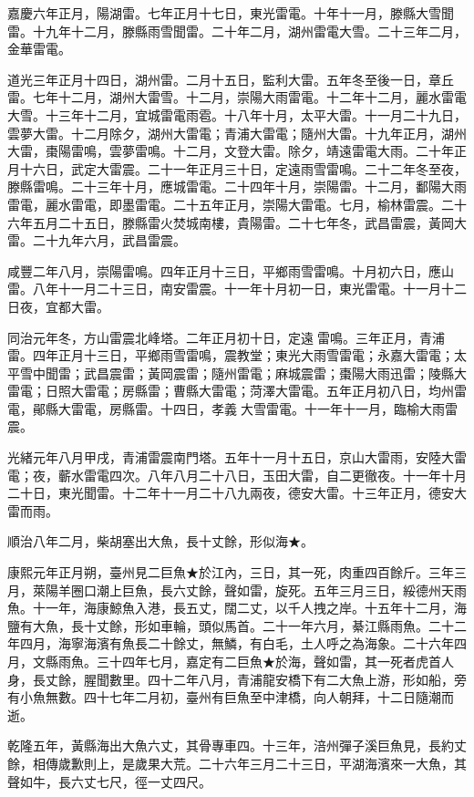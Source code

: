 \begin{pinyinscope}
嘉慶六年正月，陽湖雷。七年正月十七日，東光雷電。十年十一月，滕縣大雪聞雷。十九年十二月，滕縣雨雪聞雷。二十年二月，湖州雷電大雪。二十三年二月，金華雷電。

道光三年正月十四日，湖州雷。二月十五日，監利大雷。五年冬至後一日，章丘雷。七年十二月，湖州大雷雪。十二月，崇陽大雨雷電。十二年十二月，麗水雷電大雪。十三年十二月，宜城雷電雨雹。十八年十月，太平大雷。十一月二十九日，雲夢大雷。十二月除夕，湖州大雷電；青浦大雷電；隨州大雷。十九年正月，湖州大雷，棗陽雷鳴，雲夢雷鳴。十二月，文登大雷。除夕，靖遠雷電大雨。二十年正月十六日，武定大雷震。二十一年正月三十日，定遠雨雪雷鳴。二十二年冬至夜，滕縣雷鳴。二十三年十月，應城雷電。二十四年十月，崇陽雷。十二月，鄱陽大雨雷電，麗水雷電，即墨雷電。二十五年正月，崇陽大雷電。七月，榆林雷震。二十六年五月二十五日，滕縣雷火焚城南樓，貴陽雷。二十七年冬，武昌雷震，黃岡大雷。二十九年六月，武昌雷震。

咸豐二年八月，崇陽雷鳴。四年正月十三日，平鄉雨雪雷鳴。十月初六日，應山雷。八年十一月二十三日，南安雷震。十一年十月初一日，東光雷電。十一月十二日夜，宜都大雷。

同治元年冬，方山雷震北峰塔。二年正月初十日，定遠雷鳴。三年正月，青浦雷。四年正月十三日，平鄉雨雪雷鳴，震教堂；東光大雨雪雷電；永嘉大雷電；太平雪中聞雷；武昌震雷；黃岡震雷；隨州雷電；麻城震雷；棗陽大雨迅雷；陵縣大雷電；日照大雷電；房縣雷；曹縣大雷電；菏澤大雷電。五年正月初八日，均州雷電，鄖縣大雷電，房縣雷。十四日，孝義大雪雷電。十一年十一月，臨榆大雨雷震。

光緒元年八月甲戌，青浦雷震南門塔。五年十一月十五日，京山大雷雨，安陸大雷電；夜，蘄水雷電四次。八年八月二十八日，玉田大雷，自二更徹夜。十一年十月二十日，東光聞雷。十二年十一月二十八九兩夜，德安大雷。十三年正月，德安大雷而雨。

順治八年二月，柴胡塞出大魚，長十丈餘，形似海★。

康熙元年正月朔，臺州見二巨魚★於江內，三日，其一死，肉重四百餘斤。三年三月，萊陽羊圈口潮上巨魚，長六丈餘，聲如雷，旋死。五年三月三日，綏德州天雨魚。十一年，海康鯨魚入港，長五丈，闊二丈，以千人拽之岸。十五年十二月，海鹽有大魚，長十丈餘，形如車輪，頭似馬首。二十一年六月，綦江縣雨魚。二十二年四月，海寧海濱有魚長二十餘丈，無鱗，有白毛，土人呼之為海象。二十六年四月，文縣雨魚。三十四年七月，嘉定有二巨魚★於海，聲如雷，其一死者虎首人身，長丈餘，腥聞數里。四十二年八月，青浦龍安橋下有二大魚上游，形如船，旁有小魚無數。四十七年二月初，臺州有巨魚至中津橋，向人朝拜，十二日隨潮而逝。

乾隆五年，黃縣海出大魚六丈，其骨專車四。十三年，涪州彈子溪巨魚見，長約丈餘，相傳歲歉則上，是歲果大荒。二十六年三月二十三日，平湖海濱來一大魚，其聲如牛，長六丈七尺，徑一丈四尺。


\end{pinyinscope}
